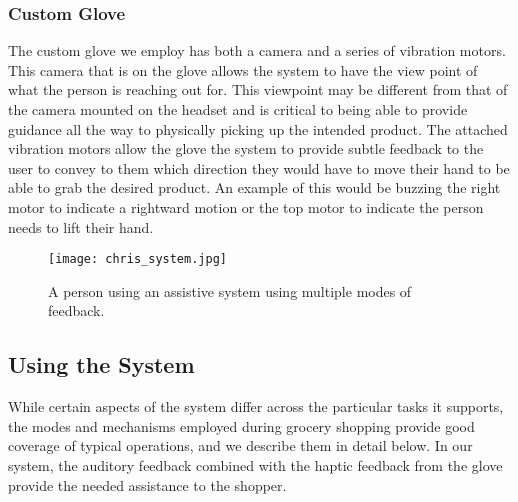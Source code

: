 \subsubsection{Custom Glove}
The custom glove we employ has both a camera and a series of vibration motors.
This camera that is on the glove allows the system to have the view
point of what the person is reaching out for. This viewpoint may be different from
that of the camera mounted on the headset and is critical to being able to provide
guidance all the way to physically picking up the intended product.
The attached vibration motors allow the glove the system to provide
subtle feedback to the user to convey to them which direction they would
have to move their hand to be able to grab the desired product. An
example of this would be buzzing the right motor to indicate a
rightward motion or the top motor to indicate the person needs to lift
their hand.

\begin{figure}[!htb]
\centering
\vspace{-5pt}
\texttt{[image: chris\_system.jpg]}
\caption{ A person using an assistive system using multiple modes of feedback.}
\label{fig:whole_system_chris}
\end{figure}

\subsection{Using the System}
While certain aspects of the system differ across the particular tasks it supports, 
the modes and mechanisms employed during grocery shopping provide good coverage of typical operations, and we describe them in detail below.
In our system, the auditory feedback combined with the haptic feedback from the glove provide the needed assistance to the shopper. 
 
